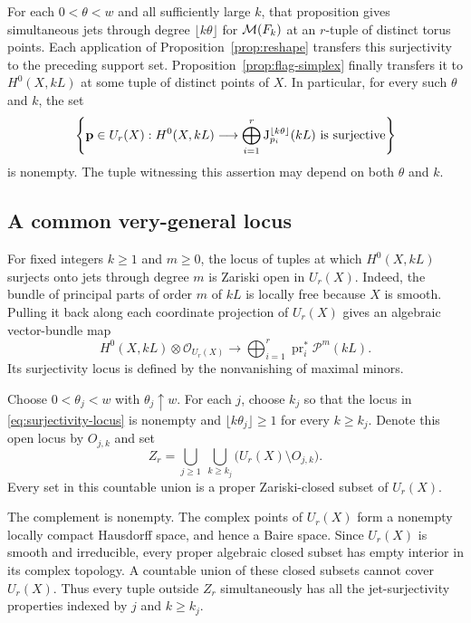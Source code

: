 For each $0<\theta<w$ and all sufficiently large $k$, that proposition
gives simultaneous jets through degree $\lfloor k\theta\rfloor$ for
$\mathcal M(F_k)$ at an $r$-tuple of distinct torus points. Each application of
Proposition~\ref{prop:reshape} transfers this surjectivity to the preceding
support set. Proposition~\ref{prop:flag-simplex} finally transfers it to
$H^0(X,kL)$ at some tuple of distinct points of $X$. In particular, for
every such $\theta$ and $k$, the set
\begin{equation}
 \label{eq:surjectivity-locus}
 \left\{\mathbf p\in U_r(X):
 H^0(X,kL)\longrightarrow
 \bigoplus_{i=1}^r\mathrm J_{p_i}^{\lfloor k\theta\rfloor}(kL)
 \text{ is surjective}\right\}
\end{equation}
is nonempty. The tuple witnessing this assertion may depend on both
$\theta$ and $k$.

\subsection{A common very-general locus}

For fixed integers $k\ge1$ and $m\ge0$, the locus of tuples at which
$H^0(X,kL)$ surjects onto jets through degree $m$ is Zariski open in
$U_r(X)$. Indeed, the bundle of principal parts of order $m$ of $kL$ is
locally free because $X$ is smooth. Pulling it back along each coordinate
projection of $U_r(X)$ gives an algebraic vector-bundle map
\[
 H^0(X,kL)\otimes\mathcal O_{U_r(X)}
 \longrightarrow
 \bigoplus_{i=1}^r\operatorname{pr}_i^*\mathcal P^m(kL).
\]
Its surjectivity locus is defined by the nonvanishing of maximal minors.

Choose $0<\theta_j<w$ with $\theta_j\uparrow w$. For each $j$, choose
$k_j$ so that the locus in \eqref{eq:surjectivity-locus} is nonempty and
$\lfloor k\theta_j\rfloor\ge1$ for every $k\ge k_j$. Denote this open
locus by $O_{j,k}$ and set
\begin{equation}
 \label{eq:exceptional-set}
 Z_r=\bigcup_{j\ge1}\ \bigcup_{k\ge k_j}
       \bigl(U_r(X)\setminus O_{j,k}\bigr).
\end{equation}
Every set in this countable union is a proper Zariski-closed subset of
$U_r(X)$.

The complement is nonempty. The complex points of $U_r(X)$ form a
nonempty locally compact Hausdorff space, and hence a Baire space. Since
$U_r(X)$ is smooth and irreducible, every proper algebraic closed subset
has empty interior in its complex topology. A countable union of these
closed subsets cannot cover $U_r(X)$. Thus every tuple outside $Z_r$
simultaneously has all the jet-surjectivity properties indexed by $j$ and
$k\ge k_j$.

